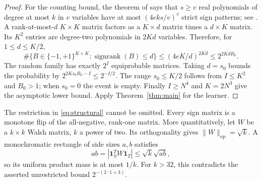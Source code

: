 \documentclass[11pt]{article}
\DeclareMathOperator{\sr}{signrank}
\newcommand{\1}{\mathbf 1}
\newcommand{\op}{\mathrm{op}}
\begin{document}
\begin{proof}
For the counting bound, the theorem of \citet{Warren68} says that $s\ge v$ real polynomials of degree at most $k$ in $v$ variables have at most $(4eks/v)^v$ strict sign patterns; see \citet[Theorem 21 and Lemma 22]{AMY16}. A rank-at-most-$d$ $K\times K$ matrix factors as a $K\times d$ matrix times a $d\times K$ matrix. Its $K^2$ entries are degree-two polynomials in $2Kd$ variables. Therefore, for $1\le d\le K/2$,
\begin{equation}\label{eq:warren}
 \#\{B\in\{-1,+1\}^{K\times K}:\sr(B)\le d\}
 \le(4eK/d)^{2Kd}\le2^{2KdB_0}.
\end{equation}
The random family has exactly $2^I$ equiprobable matrices. Taking $d=s_0$ bounds the probability by $2^{2Ks_0B_0-I}\le2^{-I/2}$. The range $s_0\le K/2$ follows from $I\le K^2$ and $B_0>1$; when $s_0=0$ the event is empty. Finally $I\ge N^4$ and $K=2N^3$ give the asymptotic lower bound. Apply Theorem~\ref{thm:main} for the learner.
\end{proof}

The restriction in \eqref{eq:structural} cannot be omitted. Every sign matrix is a monotone flip of the all-negative, rank-one matrix. More quantitatively, let $W$ be a $k\times k$ Walsh matrix, $k$ a power of two. Its orthogonality gives $\|W\|_\op=\sqrt k$. A monochromatic rectangle of side sizes $a,b$ satisfies
\[
 ab=|\1_S^TW\1_T|\le\sqrt{k}\sqrt{ab},
\]
so its uniform product mass is at most $1/k$. For $k>32$, this contradicts the asserted unrestricted bound $2^{-(2\cdot1+3)}$.
\end{document}
